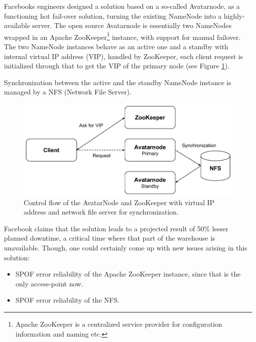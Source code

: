 \newpage
Facebooks engineers designed a solution based on a so-called Avatarnode, as a functioning hot fail-over solution, turning the existing NameNode into a highly-available server. The open source Avatarnode is essentially two NameNodes wrapped in an Apache ZooKeeper\footnote{Apache ZooKeeper\cite{PageZookeper} is a centralized service provider for configuration information and naming etc.} instance, with support for manual failover. The two NameNode instances behave as an active one and a standby with internal virtual IP address (VIP), handled by ZooKeeper, \ie each client request is initialized through that to get the VIP of the primary node (see Figure \ref{fig:facebook-avatarnode}).
\newline

Synchronization between the active and the standby NameNode instance is managed by a NFS (Network File Server).
\vspace*{3mm}

\begin{figure}[h!]
	\centering
	\includegraphics[scale=0.8]{pdf/facebook-avatarnode.pdf}
	\caption[Avatarnode: Facebooks Hadoop implementation]{Control flow of the AvatarNode and ZooKeeper with virtual IP address and network file server for synchronization. \label{fig:facebook-avatarnode}}
	\vspace*{3mm}
\end{figure}

Facebook claims that the solution leads to a projected result of 50\% lesser planned downtime, \ie a critical time where that part of the warehouse is unavailable. Though, one could certainly come up with new issues arising in this solution:
\begin{itemize}
	\item SPOF error reliability of the Apache ZooKeeper instance, since that is the only access-point now.
	\item SPOF error reliability of the NFS.
\end{itemize}

